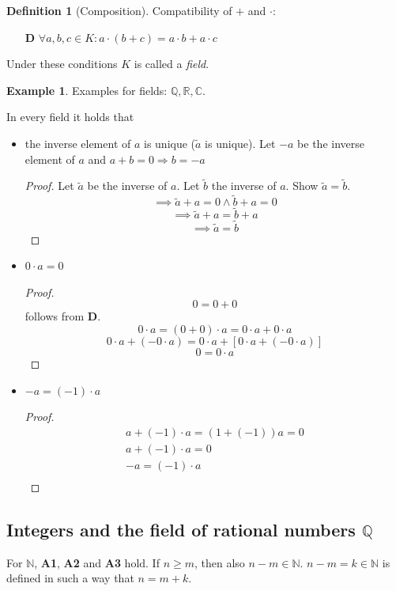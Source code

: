 \documentclass[a4paper,landscape,twocolumn]{article}
\theoremstyle{definition}
\newtheorem{defi}{Definition}
\newtheorem{ex}{Example}
\begin{document}
\begin{defi}[Composition]
  Compatibility of $+$ and $\cdot$:
  \begin{itemize}
    \item[\textbf{D}] $\forall a,b,c \in K: a \cdot (b + c) = a \cdot b + a \cdot c$
  \end{itemize}
  Under these conditions $K$ is called a \emph{field}.
\end{defi}

\begin{ex}
  Examples for fields: $\mathbb{Q}, \mathbb{R}, \mathbb{C}$.

  In every field it holds that
  \begin{itemize}
    \item the inverse element of $a$ is unique ($\tilde a$ is unique).
      Let $-a$ be the inverse element of $a$ and $a + b = 0 \Rightarrow b = -a$
      \begin{proof}
        Let $\tilde a$ be the inverse of $a$. Let $\tilde b$ the inverse of $a$.
        Show $\tilde a = \tilde b$.
        \[ \implies \tilde a + a = 0 \land \tilde b + a = 0 \]
        \[ \implies \tilde a + a = \tilde b + a \]
        \[ \implies \tilde a = \tilde b \]
      \end{proof}
    \item $0 \cdot a = 0$
      \begin{proof}
        \[ 0 = 0 + 0 \]
        follows from \textbf{D}.
        \[ 0 \cdot a = (0 + 0) \cdot a = 0 \cdot a + 0 \cdot a \]
        \[ 0 \cdot a + (-0 \cdot a) = 0 \cdot a + \left[0 \cdot a + (-0 \cdot a)\right] \]
        \[ 0 = 0 \cdot a \]
      \end{proof}
    \item $-a = (-1) \cdot a$
      \begin{proof}
        \begin{align*}
          a + (-1) \cdot a = (1 + (-1)) a = 0 \\
          a + (-1) \cdot a = 0 \\
          -a = (-1) \cdot a \\
        \end{align*}
      \end{proof}
  \end{itemize}
\end{ex}

\subsection{Integers and the field of rational numbers $\mathbb{Q}$}
%
For $\mathbb{N}$, \textbf{A1}, \textbf{A2} and \textbf{A3} hold.
If $n \geq m$, then also $n - m \in \mathbb{N}$.
$n-m = k \in \mathbb{N}$ is defined in such a way that $n = m + k$.
\end{document}
